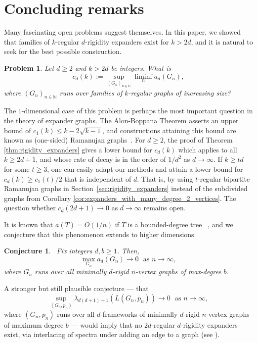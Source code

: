 \documentclass[a4paper,11pt]{article}
\theoremstyle{plain}
\newtheorem{problem}[theorem]{\bf Problem}
\newtheorem{conjecture}[theorem]{\bf Conjecture}
\theoremstyle{definition}
\begin{document}
\section{Concluding remarks}\label{sec:concluding}
Many fascinating open problems suggest themselves. In this paper, we showed that families of $k$-regular $d$-rigidity expanders exist for $k>2d$, and it is natural to seek for the best possible construction.
\begin{problem}
Let $d \ge 2$ and $k>2d$ be integers. What is 
$$
c_d(k) := \sup_{(G_n)_{n\in\mathbb N}}\liminf_n a_d(G_n),
$$
where $(G_n)_{n\in\mathbb N}$ runs over families of $k$-regular graphs of increasing size?
\end{problem}
The $1$-dimensional case of this problem is perhaps the most important question in the theory of expander graphs. The Alon-Boppana Theorem asserts an upper bound of $c_1(k)\le k-2\sqrt{k-1}$, and constructions attaining this bound are known as (one-sided) Ramanujan graphs~\cite{LPS,MSS}. 
For $d\ge 2$, the proof of Theorem \ref{thm:rigidity_expanders} gives a lower bound for $c_d(k)$ which applies to all $k\ge 2d+1$, and whose rate of decay is in the order of $1/d^2$ as $d\to\infty$. If $k\ge td$ for some $t\geq 3$, one can easily adapt our methods and attain a lower bound for $c_d(k) \ge c_1(t)/2$ that is independent of $d$. That is, by using $t$-regular bipartite Ramanujan graphs in Section~\ref{sec:rigidity_expanders} instead of the subdivided graphs from Corollary \ref{cor:expanders_with_many_degree_2_vertices}. The question whether $c_d(2d+1)\to 0$ as $d\to\infty$ remains open.

It is known that $a(T) = O(1/n)$ if $T$ is a bounded-degree tree ~\cite{kolokolnikov2015maximizing}, and we conjecture that this phenomenon extends to higher dimensions.
\begin{conjecture}~\label{conj:percent-ev}
Fix integers $d,b\ge 1$. Then,
\[
\max_{G_n} a_d(G_n) \to 0~~~\mbox{as }n\to\infty,
\]
where $G_n$ runs over all minimally $d$-rigid $n$-vertex graphs of max-degree $b$.
\end{conjecture}

A  stronger but still plausible conjecture --- that $$\sup_{(G_n,p_n)}\lambda_{d(d+1)+1}(L(G_n,p_n))\to 0~~~\mbox{as }n\to\infty,$$ where 
$(G_n,p_n)$ runs over all $d$-frameworks of minimally $d$-rigid $n$-vertex graphs of maximum degree $b$ --- would imply that no $2d$-regular $d$-rigidity expanders exist, via interlacing of spectra under adding an edge to a graph (see \cite[Theorem 2.3]{lew2022d}).
\end{document}
